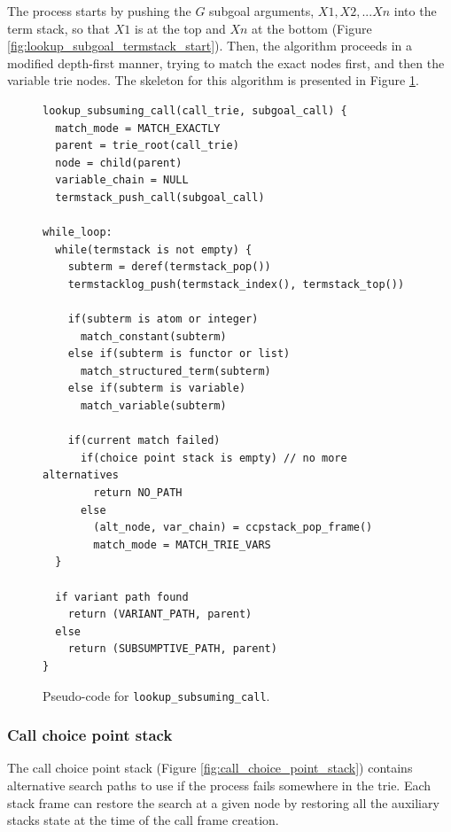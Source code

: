 The process starts by pushing the $G$ subgoal arguments, $X1, X2, ...Xn$ into the term stack, so that $X1$ is at the top
and $Xn$ at the bottom (Figure \ref{fig:lookup_subgoal_termstack_start}).
Then, the algorithm proceeds in a modified depth-first manner, trying to match the exact nodes first, and then
the variable trie nodes. The skeleton for this algorithm is presented in Figure \ref{fig:lookup_subsuming_call}.

\begin{figure}[ht]
\begin{Verbatim}[fontsize=\small]
lookup_subsuming_call(call_trie, subgoal_call) {
  match_mode = MATCH_EXACTLY
  parent = trie_root(call_trie)
  node = child(parent)
  variable_chain = NULL
  termstack_push_call(subgoal_call)

while_loop:
  while(termstack is not empty) {
    subterm = deref(termstack_pop())
    termstacklog_push(termstack_index(), termstack_top())
  
    if(subterm is atom or integer)
      match_constant(subterm)
    else if(subterm is functor or list)
      match_structured_term(subterm)
    else if(subterm is variable)
      match_variable(subterm)
  
    if(current match failed)
      if(choice point stack is empty) // no more alternatives
        return NO_PATH
      else
        (alt_node, var_chain) = ccpstack_pop_frame()
        match_mode = MATCH_TRIE_VARS
  }
  
  if variant path found
    return (VARIANT_PATH, parent)
  else
    return (SUBSUMPTIVE_PATH, parent)
}
\end{Verbatim}
\caption{Pseudo-code for \texttt{lookup\_subsuming\_call}.}
\label{fig:lookup_subsuming_call}
\end{figure}

\subsubsection{Call choice point stack}

The call choice point stack (Figure \ref{fig:call_choice_point_stack}) contains alternative
search paths to use if the process fails somewhere in the trie.
Each stack frame can restore the search at a given node by restoring all the auxiliary stacks state at the time
of the call frame creation.

